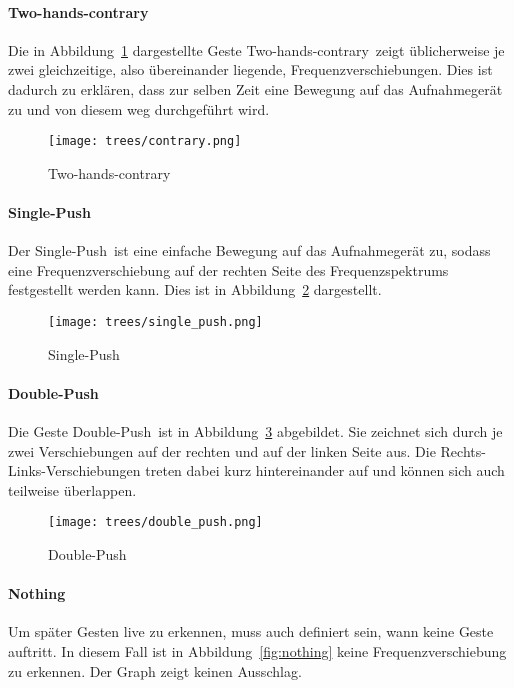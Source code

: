 \paragraph*{Two-hands-contrary}
Die in Abbildung~\ref{fig:contrary} dargestellte Geste \glqq Two-hands-contrary\grqq\ zeigt üblicherweise je zwei gleichzeitige, also übereinander liegende, Frequenzverschiebungen. Dies ist dadurch zu erklären, dass zur selben Zeit eine Bewegung auf das Aufnahmegerät zu und von diesem weg durchgeführt wird.

\begin{figure}[htbp] \centering
\texttt{[image: trees/contrary.png]}
\caption{Two-hands-contrary}
\label{fig:contrary}
\end{figure}


\paragraph*{Single-Push}
Der \glqq Single-Push\grqq\ ist eine einfache Bewegung auf das Aufnahmegerät zu, sodass eine Frequenzverschiebung auf der rechten Seite des Frequenzspektrums festgestellt werden kann. Dies ist in Abbildung~\ref{fig:single_push} dargestellt.

\begin{figure}[htbp] \centering
\texttt{[image: trees/single\_push.png]}
\caption{Single-Push}
\label{fig:single_push}
\end{figure}

\paragraph*{Double-Push}
Die Geste \glqq Double-Push\grqq\ ist in Abbildung~\ref{fig:double_push} abgebildet. Sie zeichnet sich durch je zwei Verschiebungen auf der rechten und auf der linken Seite aus. Die Rechts-Links-Verschiebungen treten dabei kurz hintereinander auf und können sich auch teilweise überlappen. 

\begin{figure}[htbp] \centering
\texttt{[image: trees/double\_push.png]}
\caption{Double-Push}
\label{fig:double_push}
\end{figure}

\paragraph*{Nothing}
Um später Gesten live zu erkennen, muss auch definiert sein, wann keine Geste auftritt. In diesem Fall ist in Abbildung~\ref{fig:nothing} keine Frequenzverschiebung zu erkennen. Der Graph zeigt keinen Ausschlag.

